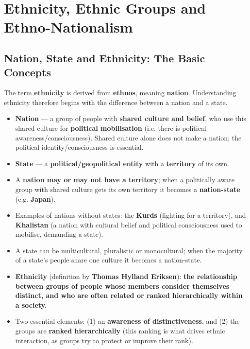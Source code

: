 \section{Ethnicity, Ethnic Groups and Ethno-Nationalism}

\subsection{Nation, State and Ethnicity: The Basic Concepts}

The term \textbf{ethnicity} is derived from \textbf{ethnos}, meaning \textbf{nation}. Understanding ethnicity therefore begins with the difference between a nation and a state.

\begin{KeyConcept}
\begin{itemize}
\item \textbf{Nation} --- a group of people with \textbf{shared culture and belief}, who use this shared culture for \textbf{political mobilisation} (i.e. there is political awareness/consciousness). Shared culture alone does not make a nation; the political identity/consciousness is essential.
\item \textbf{State} --- a \textbf{political/geopolitical entity} with a \textbf{territory} of its own.
\item A \textbf{nation may or may not have a territory}; when a politically aware group with shared culture gets its own territory it becomes a \textbf{nation-state} (e.g. \textbf{Japan}).
\item Examples of nations without states: the \textbf{Kurds} (fighting for a territory), and \textbf{Khalistan} (a nation with cultural belief and political consciousness used to mobilise, demanding a state).
\item A state can be multicultural, pluralistic or monocultural; when the majority of a state's people share one culture it becomes a nation-state.
\end{itemize}
\end{KeyConcept}

\begin{KeyConcept}
\begin{itemize}
\item \textbf{Ethnicity} (definition by \textbf{Thomas Hylland Eriksen}): \textbf{the relationship between groups of people whose members consider themselves distinct, and who are often related or ranked hierarchically within a society.}
\item Two essential elements: (1) an \textbf{awareness of distinctiveness}, and (2) the groups are \textbf{ranked hierarchically} (this ranking is what drives ethnic interaction, as groups try to protect or improve their rank).
\end{itemize}
\end{KeyConcept}


